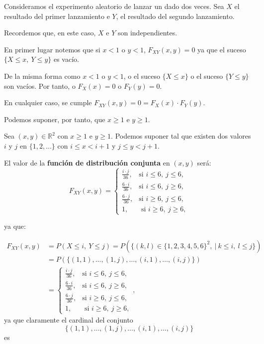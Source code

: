\documentclass[]{book}
\begin{document}
Consideramos el experimento aleatorio de lanzar un dado dos veces. Sea \(X\) el resultado del primer lanzamiento e \(Y\), el resultado del segundo lanzamiento.

Recordemos que, en este caso, \(X\) e \(Y\) son independientes.

En primer lugar notemos que si \(x<1\) o \(y<1\), \(F_{XY}(x,y)=0\) ya que el suceso \(\{X\leq x,\ Y\leq y\}\) es vacío.

De la misma forma como \(x<1\) o \(y<1\), o el suceso \(\{X\leq x\}\) o el suceso \(\{Y\leq y\}\) son vacíos. Por tanto, o \(F_X(x)=0\) o \(F_Y(y)=0\).

En cualquier caso, se cumple \(F_{XY}(x,y)=0=F_X(x)\cdot F_Y(y)\).

Podemos suponer, por tanto, que \(x\geq 1\) e \(y\geq 1\).

Sea \((x,y)\in \mathbb{R}^2\) con \(x\geq 1\) e \(y\geq 1\). Podemos suponer tal que existen dos valores \(i\) y \(j\) en \(\{1,2,\ldots\}\) con \(i\leq x < i+1\) y \(j\leq y <j+1\).

El valor de la \textbf{función de distribución conjunta} en \((x,y)\) será:
\[
F_{XY}(x,y)=\begin{cases}
\frac{i\cdot j}{36}, & \mbox{si }i\leq 6, \ j\leq 6, \\
\frac{6 \cdot i}{36}, & \mbox{si }i\leq 6,\ j\geq 6,\\
\frac{6\cdot j}{36}, & \mbox{si }i\geq 6,\ j\leq 6,\\
1, & \mbox{ si }i\geq 6,\ j\geq 6,
\end{cases}
\]

ya que:

\[
\begin{array}{rl}
F_{XY}(x,y) & =P(X\leq i,\ Y\leq j)=P(\{(k,l)\in \{1,2,3,4,5,6\}^2,\ |\ k\leq i,\ l\leq j\})\\ & =P(\{(1,1),\ldots,(1,j),\ldots,(i,1),\ldots,(i,j)\})
\\
& =\begin{cases}
\frac{i\cdot j}{36}, & \mbox{si }i\leq 6, \ j\leq 6, \\
\frac{6\cdot i}{36}, & \mbox{si }i\leq 6,\ j\geq 6,\\
\frac{6\cdot j}{36}, & \mbox{si }i\geq 6,\ j\leq 6,\\
1, & \mbox{ si }i\geq 6,\ j\geq 6,
\end{cases},
\end{array}
\]
ya que claramente el cardinal del conjunto
\[\{(1,1),\ldots,(1,j),\ldots,(i,1),\ldots,(i,j)\}\]
es
\end{document}
